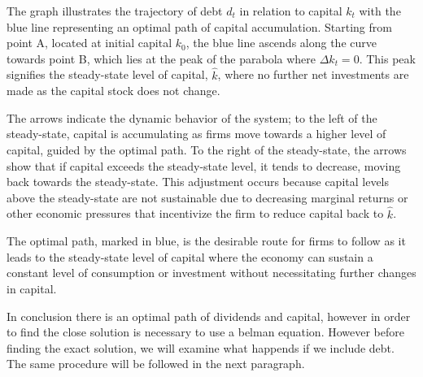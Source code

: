 \documentclass[12pt]{article}
\begin{document}
The graph illustrates the trajectory of debt \( d_t \) in relation to capital \( k_t \) with the blue line representing
an optimal path of capital accumulation. Starting from point A, located at initial capital \( k_0 \), the blue line
ascends along the curve towards point B, which lies at the peak of the parabola where \( \Delta k_t = 0 \). This peak
signifies the steady-state level of capital, \( \hat{k} \), where no further net investments are made as the capital
stock does not change. 

The arrows indicate the dynamic behavior of the system; to the left of the steady-state, capital is accumulating as
firms move towards a higher level of capital, guided by the optimal path. To the right of the steady-state, the arrows
show that if capital exceeds the steady-state level, it tends to decrease, moving back towards the steady-state. This
adjustment occurs because capital levels above the steady-state are not sustainable due to decreasing marginal returns
or other economic pressures that incentivize the firm to reduce capital back to \( \hat{k} \). 

The optimal path, marked in blue, is the desirable route for firms to follow as it leads to the steady-state level of
capital where the economy can sustain a constant level of consumption or investment without necessitating further
changes in capital. 

In conclusion there is an optimal path of dividends and capital, however in order to find the close solution is
necessary to use a belman equation. However before finding the exact solution, we will examine what happends if we
include debt. The same procedure will be followed in the next paragraph.
\end{document}
